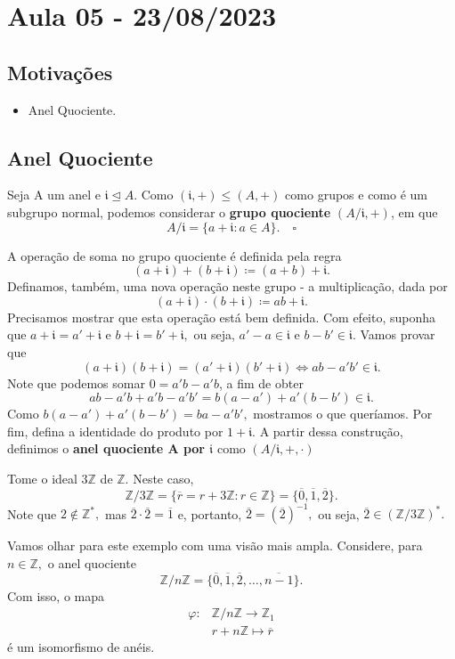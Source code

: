 \documentclass[algebraII_notes.tex]{subfiles}
\begin{document}
\section{Aula 05 - 23/08/2023}
\subsection{Motivações}
\begin{itemize}
	\item Anel Quociente.
\end{itemize}
\subsection{Anel Quociente}
\begin{def*}
	Seja A um anel e \(\mathfrak{i}\trianglelefteq{A}.\) Como \((\mathfrak{i}, +)\leq (A, +)\) como grupos e
	como é um subgrupo normal, podemos considerar o \textbf{grupo quociente} \((A/\mathfrak{i}, +)\), em que
	\[
		A/\mathfrak{i} = \{a + \mathfrak{i}: a \in A\}.\quad\square
	\]
\end{def*}
A operação de soma no grupo quociente é definida pela regra
\[
	(a+\mathfrak{i})+(b+\mathfrak{i})\coloneqq (a+b)+\mathfrak{i}.
\]
Definamos, também, uma nova operação neste grupo - a multiplicação, dada por
\[
	(a+\mathfrak{i})\cdot (b+\mathfrak{i})\coloneqq ab + \mathfrak{i}.
\]
Precisamos mostrar que esta operação está bem definida. Com efeito, suponha que
\(a+\mathfrak{i} = a'+\mathfrak{i}\) e \(b+\mathfrak{i} = b'+\mathfrak{i},\) ou seja,
\(a'-a\in \mathfrak{i}\) e \(b-b'\in \mathfrak{i}.\) Vamos provar que
\[
	(a+\mathfrak{i})(b+\mathfrak{i}) = (a'+\mathfrak{i})(b'+\mathfrak{i}) \Longleftrightarrow ab - a'b'\in \mathfrak{i}.
\]
Note que podemos somar \(0=a'b-a'b\), a fim de obter
\[
	ab - a'b + a'b - a'b' = b(a-a') + a'(b-b')\in \mathfrak{i}.
\]
Como \(b(a-a') + a'(b-b') = ba - a'b',\) mostramos o que queríamos. Por fim,
defina a identidade do produto por \(1 + \mathfrak{i}.\) A partir dessa construção,
definimos o \textbf{anel quociente A por \(\mathfrak{i}\)} como \((A/\mathfrak{i}, +, \cdot )\)
\begin{example}
	Tome o ideal \(3 \mathbb{Z}\) de \(\mathbb{Z}.\) Neste caso,
	\[
		\mathbb{Z}/3 \mathbb{Z} = \{\overline{r} = r + 3 \mathbb{Z}:r\in \mathbb{Z}\} = \{\overline{0}, \overline{1}, \overline{2}\}.
	\]
	Note que \(2\not\in \mathbb{Z}^{*},\) mas \(\overline{2}\cdot \overline{2} = \overline{1}\) e, portanto, \(\overline{2} = (\overline{2})^{-1},\) ou seja,
	\(\overline{2}\in (\mathbb{Z}/3 \mathbb{Z})^{*}.\)

	Vamos olhar para este exemplo com uma visão mais ampla. Considere, para \(n\in \mathbb{Z},\) o anel quociente
	\[
		\mathbb{Z}/n \mathbb{Z} = \{\overline{0}, \overline{1}, \overline{2}, \dotsc , \overline{n-1}\}.
	\]
	Com isso, o mapa
	\begin{align*}
		\varphi : & \mathbb{Z}/n \mathbb{Z}\rightarrow \mathbb{Z}_{1} \\
		          & r + n\mathbb{Z}\mapsto \overline{r}
	\end{align*}
	é um isomorfismo de anéis.
\end{example}
\end{document}
